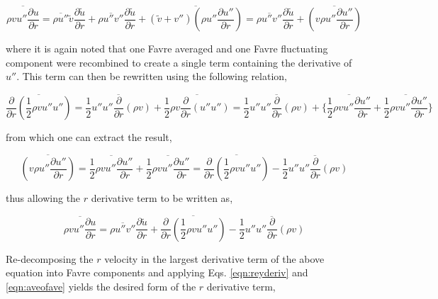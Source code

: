 \begin{displaymath}
	\overline{\rho v u'' \frac{\partial u}{\partial r}} = \overline{\rho u''} \tilde v \frac{\partial \tilde u}{\partial r}
	+ \overline{\rho u'' v''}\frac{\partial \tilde u}{\partial r} + \overline{(\tilde v + v'')(\rho u'' 
	\frac{\partial u''}{\partial r})} = \overline{\rho u'' v''}\frac{\partial \tilde u}{\partial r} + \overline{(v \rho u'' 
	\frac{\partial u''}{\partial r})}
\end{displaymath}

	where it is again noted that one Favre averaged and one Favre fluctuating component were recombined to create a single
term containing the derivative of $u''$.  This term can then be rewritten using the following relation,

\begin{displaymath}
	\overline{\frac{\partial}{\partial r}(\frac{1}{2}\rho v u'' u'')}= \overline{\frac{1}{2}u''u''\frac{\partial}
	{\partial r}(\rho v)} + \overline{\frac{1}{2}\rho v\frac{\partial}{\partial r}(u'' u'')} = \overline{\frac{1}{2}u''u''
	\frac{\partial}{\partial r}(\rho v)} + \Big\{ \overline{\frac{1}{2}\rho v u'' \frac{\partial u''}{\partial r}}
	+ \overline{\frac{1}{2}\rho v u'' \frac{\partial u''}{\partial r}}\Big\}
\end{displaymath}

	from which one can extract the result,

\begin{displaymath}
	\overline{(v \rho u''\frac{\partial u''}{\partial r})} = \overline{\frac{1}{2}\rho v u'' \frac{\partial u''}{\partial r}}
	+ \overline{\frac{1}{2}\rho v u'' \frac{\partial u''}{\partial r}} = \overline{\frac{\partial}{\partial r}
	(\frac{1}{2}\rho v u'' u'')} - \overline{\frac{1}{2}u''u''\frac{\partial}{\partial r}(\rho v)}
\end{displaymath}

	thus allowing the $r$ derivative term to be written as,

\begin{displaymath}
	\overline{\rho v u'' \frac{\partial u}{\partial r}} = \overline{\rho u'' v''}\frac{\partial \tilde u}{\partial r}	
	+ \overline{\frac{\partial}{\partial r}
	(\frac{1}{2}\rho v u'' u'')} - \overline{\frac{1}{2}u''u''\frac{\partial}{\partial r}(\rho v)}
\end{displaymath}

	Re-decomposing the $r$ velocity in the largest derivative term of the above equation into Favre components
and applying Eqs. \ref{eqn:reyderiv} and \ref{eqn:aveofave} yields the desired form of the $r$ derivative term,

